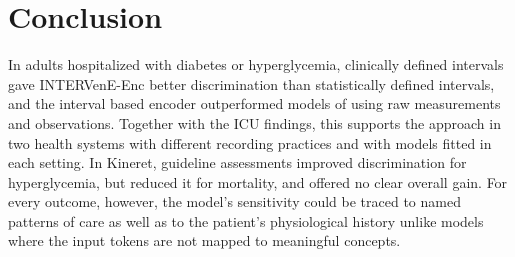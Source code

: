 \section{Conclusion}
\label{sec:conclusion}
In adults hospitalized with diabetes or hyperglycemia, clinically defined intervals gave INTERVenE-Enc better discrimination than statistically defined intervals, and the interval based encoder outperformed models of using raw measurements and observations. Together with the ICU findings, this supports the approach in two health systems with different recording practices and with models fitted in each setting. In Kineret, guideline assessments improved discrimination for hyperglycemia, but reduced it for mortality, and offered no clear overall gain. For every outcome, however, the model's sensitivity could be traced to named patterns of care as well as to the patient's physiological history unlike models where the input tokens are not mapped to meaningful concepts.

